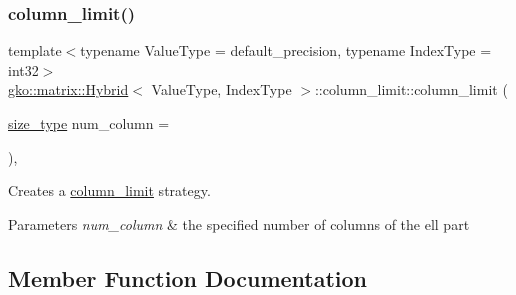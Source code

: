 \subsubsection{\texorpdfstring{column\+\_\+limit()}{column\_limit()}}
{\footnotesize\ttfamily template$<$typename Value\+Type = default\+\_\+precision, typename Index\+Type = int32$>$ \\
\hyperlink{classgko_1_1matrix_1_1Hybrid}{gko\+::matrix\+::\+Hybrid}$<$ Value\+Type, Index\+Type $>$\+::column\+\_\+limit\+::column\+\_\+limit (\begin{DoxyParamCaption}\item[{\hyperlink{namespacegko_a6e5c95df0ae4e47aab2f604a22d98ee7}{size\+\_\+type}}]{num\+\_\+column = {} }\end{DoxyParamCaption})\hspace{0.3cm}{\ttfamily [inline]}, {\ttfamily [explicit]}}



Creates a \hyperlink{classgko_1_1matrix_1_1Hybrid_1_1column__limit}{column\+\_\+limit} strategy. 


\begin{DoxyParams}{Parameters}
{\em num\+\_\+column} & the specified number of columns of the ell part \\
\hline
\end{DoxyParams}


\subsection{Member Function Documentation}
\mbox{\label{classgko_1_1matrix_1_1Hybrid_1_1column__limit_afb410def66106b711ac094fd31d48aba}} 

